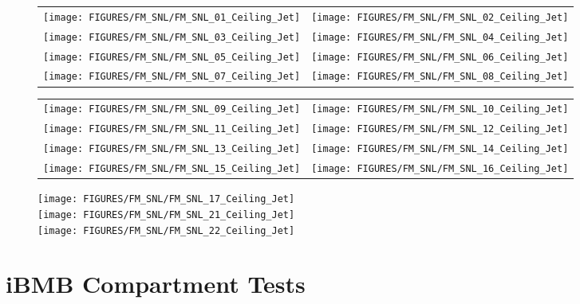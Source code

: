 \begin{figure}[p]
\begin{tabular*}{\textwidth}{l@{\extracolsep{\fill}}r}
\texttt{[image: FIGURES/FM\_SNL/FM\_SNL\_01\_Ceiling\_Jet]} &
\texttt{[image: FIGURES/FM\_SNL/FM\_SNL\_02\_Ceiling\_Jet]} \\
\texttt{[image: FIGURES/FM\_SNL/FM\_SNL\_03\_Ceiling\_Jet]} &
\texttt{[image: FIGURES/FM\_SNL/FM\_SNL\_04\_Ceiling\_Jet]} \\
\texttt{[image: FIGURES/FM\_SNL/FM\_SNL\_05\_Ceiling\_Jet]} &
\texttt{[image: FIGURES/FM\_SNL/FM\_SNL\_06\_Ceiling\_Jet]} \\
\texttt{[image: FIGURES/FM\_SNL/FM\_SNL\_07\_Ceiling\_Jet]} &
\texttt{[image: FIGURES/FM\_SNL/FM\_SNL\_08\_Ceiling\_Jet]}
\end{tabular*}
\end{figure}

\begin{figure}[p]
\begin{tabular*}{\textwidth}{l@{\extracolsep{\fill}}r}
\texttt{[image: FIGURES/FM\_SNL/FM\_SNL\_09\_Ceiling\_Jet]} &
\texttt{[image: FIGURES/FM\_SNL/FM\_SNL\_10\_Ceiling\_Jet]} \\
\texttt{[image: FIGURES/FM\_SNL/FM\_SNL\_11\_Ceiling\_Jet]} &
\texttt{[image: FIGURES/FM\_SNL/FM\_SNL\_12\_Ceiling\_Jet]} \\
\texttt{[image: FIGURES/FM\_SNL/FM\_SNL\_13\_Ceiling\_Jet]} &
\texttt{[image: FIGURES/FM\_SNL/FM\_SNL\_14\_Ceiling\_Jet]} \\
\texttt{[image: FIGURES/FM\_SNL/FM\_SNL\_15\_Ceiling\_Jet]} &
\texttt{[image: FIGURES/FM\_SNL/FM\_SNL\_16\_Ceiling\_Jet]}
\end{tabular*}
\end{figure}

\begin{figure}[p]
\begin{center}
\texttt{[image: FIGURES/FM\_SNL/FM\_SNL\_17\_Ceiling\_Jet]} \\
\texttt{[image: FIGURES/FM\_SNL/FM\_SNL\_21\_Ceiling\_Jet]} \\
\texttt{[image: FIGURES/FM\_SNL/FM\_SNL\_22\_Ceiling\_Jet]}
\end{center}
\end{figure}

\clearpage

\section{iBMB Compartment Tests}

